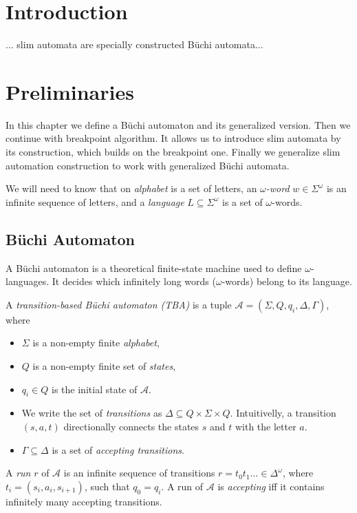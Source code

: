 \documentclass[
	digital
nolof, nolot
]{fithesis3}
\newcommand{\cA}{\mathcal{A}}
\begin{document}
	\chapter{Introduction}
	... slim automata are specially constructed Büchi automata...
	\chapter{Preliminaries}
		In this chapter we define a Büchi automaton and its generalized version.
		Then we continue with breakpoint algorithm. It allows us to introduce slim automata by its construction, which builds on the breakpoint one. Finally we generalize slim automation construction to work with generalized Büchi automata.
		
		We will need to know that on \emph{alphabet} is a set of letters, an \emph{$\omega$-word} $w \in \Sigma^\omega$ is an infinite sequence of letters, and a \emph{language} $L \subseteq \Sigma^\omega$ is a set of $\omega$-words.
		\section{Büchi Automaton}
			A Büchi automaton is a theoretical finite-state machine used to define $\omega$-languages. It decides which infinitely long words ($\omega$-words) belong to its language.
			
			A \emph{transition-based Büchi automaton (TBA)} is a tuple $\cA=(\Sigma, Q, q_i, \Delta, \Gamma)$, where 
			\begin{itemize}
				\item $\Sigma$ is a non-empty finite \emph{alphabet},
				\item $Q$ is a non-empty finite set of \emph{states},
				\item $q_i \in Q$ is the initial state of $\cA$.
				\item We write the set of \emph{transitions} as $\Delta \subseteq Q \times \Sigma \times Q$. Intuitivelly, a transition $(s, a, t)$  directionally connects the states $s$ and $t$ with the letter $a$.
				\item $\Gamma \subseteq \Delta$ is a set of \emph{accepting transitions}.
			\end{itemize}
			
			A \emph{run} $r$ of $\cA$ is an infinite sequence of transitions
			$r=t_0t_1\ldots\in\Delta^\omega$, where $t_i=(s_i, a_i,s_{i+1})$,
			 such that $q_0=q_i$.
			A run of $\cA$ is \emph{accepting} iff it contains infinitely many accepting transitions.
\end{document}
